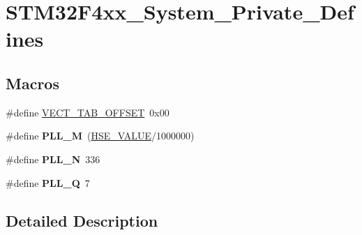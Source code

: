 \hypertarget{group___s_t_m32_f4xx___system___private___defines}{\section{S\-T\-M32\-F4xx\-\_\-\-System\-\_\-\-Private\-\_\-\-Defines}
\label{group___s_t_m32_f4xx___system___private___defines}
}
\subsection*{Macros}
\begin{DoxyCompactItemize}
\item 
\#define \hyperlink{group___s_t_m32_f4xx___system___private___defines_ga40e1495541cbb4acbe3f1819bd87a9fe}{V\-E\-C\-T\-\_\-\-T\-A\-B\-\_\-\-O\-F\-F\-S\-E\-T}~0x00
\item 
\hypertarget{group___s_t_m32_f4xx___system___private___defines_ga0fa5a868f5cd056a04b1c42e454b9617}{\#define {\bfseries P\-L\-L\-\_\-\-M}~(\hyperlink{group___library__configuration__section_gaeafcff4f57440c60e64812dddd13e7cb}{H\-S\-E\-\_\-\-V\-A\-L\-U\-E}/1000000)}\label{group___s_t_m32_f4xx___system___private___defines_ga0fa5a868f5cd056a04b1c42e454b9617}

\item 
\hypertarget{group___s_t_m32_f4xx___system___private___defines_ga04586ea638d21afe558db4f2798c38a6}{\#define {\bfseries P\-L\-L\-\_\-\-N}~336}\label{group___s_t_m32_f4xx___system___private___defines_ga04586ea638d21afe558db4f2798c38a6}

\item 
\hypertarget{group___s_t_m32_f4xx___system___private___defines_gac958257ddb2537c539cffdb3a4543067}{\#define {\bfseries P\-L\-L\-\_\-\-Q}~7}\label{group___s_t_m32_f4xx___system___private___defines_gac958257ddb2537c539cffdb3a4543067}

\end{DoxyCompactItemize}


\subsection{Detailed Description}


